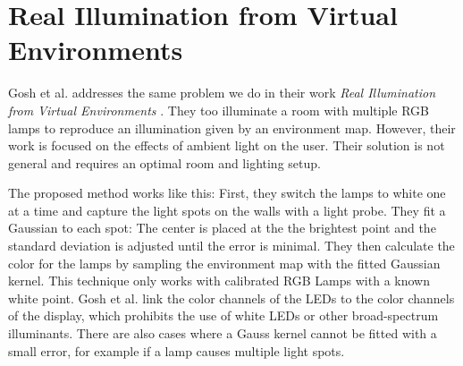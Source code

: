 \section{Real Illumination from Virtual Environments}
  
 Gosh et al. addresses the same problem we do in their work \emph{Real Illumination from Virtual Environments} \cite{ghosh2005real}.
 They too illuminate a room with multiple RGB lamps to reproduce an illumination given by an environment map. 
 However, their work is focused on the effects of ambient light on the user. 
 Their solution is not general and requires an optimal room and lighting setup.
 
 The proposed method works like this: First, they switch the lamps to white one at a time and capture the light spots on the walls with a light probe. 
 They fit a Gaussian to each spot: The center is placed at the the brightest point and the standard deviation is adjusted until the error is minimal.
 They then calculate the color for the lamps by sampling the environment map with the fitted Gaussian kernel.
 This technique only works with calibrated RGB Lamps with a known white point.
 Gosh et al. link the color channels of the LEDs to the color channels of the display, which prohibits the use of white LEDs or other broad-spectrum illuminants.
 There are also cases where a Gauss kernel cannot be fitted with a small error, for example if a lamp causes multiple light spots.
 
